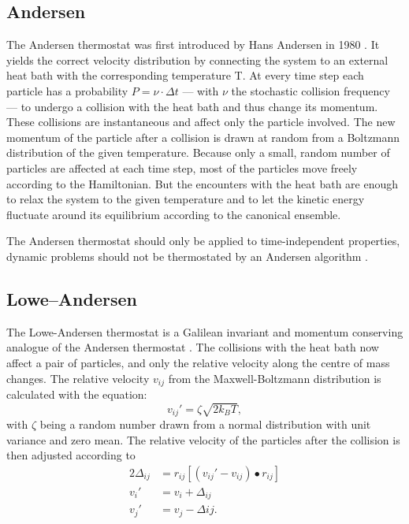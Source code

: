 \subsection{Andersen}

The Andersen thermostat was first introduced by Hans Andersen in 1980 \cite{Andersen1}.
It yields the correct velocity distribution by connecting the system to an external heat bath with the corresponding temperature T.
At every time step each particle has a probability $P=\nu\cdot\Delta t$ --- with $\nu$ the stochastic collision frequency --- to undergo a collision with the heat bath and thus change its momentum. These collisions are instantaneous and affect only the particle involved.
The new momentum of the particle after a collision is drawn at random from a Boltzmann distribution of the given temperature.
Because only a small, random number of particles are affected at each time step, most of the particles move freely according to the Hamiltonian. But the encounters with the heat bath are enough to relax the system to the given temperature and to let the kinetic energy fluctuate around its equilibrium according to the canonical ensemble.

The Andersen thermostat should only be applied to time-independent properties, dynamic problems should not be thermostated by an Andersen algorithm \cite{Andersen2}.

\subsection{Lowe--Andersen}
The Lowe-Andersen thermostat is a Galilean invariant and momentum conserving analogue of the Andersen thermostat \cite{LoweAndersen}.
The collisions with the heat bath now affect a pair of particles, and only the relative velocity along the centre of mass changes. The relative velocity $v_{ij}$ from the Maxwell-Boltzmann distribution is calculated with the equation:
\begin{equation}
v_{ij}'=\zeta\sqrt{2k_BT},
\end{equation}
with $\zeta$ being a random number drawn from a normal distribution with unit variance and zero mean.
The relative velocity of the particles after the collision is then adjusted according to
\begin{align}
2\Delta_{ij}&=r_{ij}\left[(v_{ij}'-v_{ij})\bullet r_{ij}\right]\\
v_i'&=v_i+\Delta_{ij}\\
v_j'&=v_j-\Delta{ij}.\\
\end{align}
